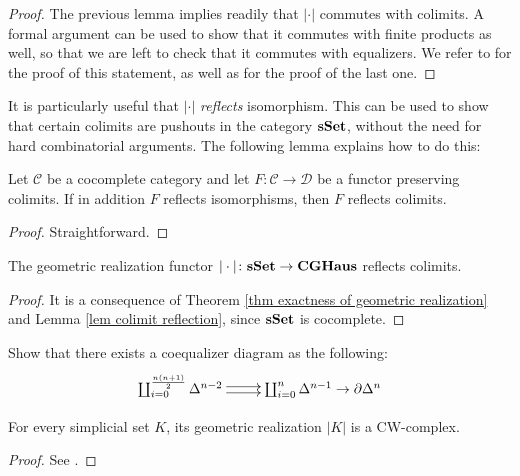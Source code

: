\begin{refsection}
\begin{proof}
The previous lemma implies readily that $| \cdot |$ commutes with colimits. A formal argument can be used to show that it commutes with finite products as well, so that we are left to check that it commutes with equalizers. We refer to \cite[Ch. III.3]{gz} for the proof of this statement, as well as for the proof of the last one.
\end{proof}

It is particularly useful that $| \cdot |$ \emph{reflects} isomorphism. This can be used to show that certain colimits are pushouts in the category $\mathbf{s\,\!\mathbf{Set}}$, without the need for hard combinatorial arguments. The following lemma explains how to do this:

\begin{lemma} \label{lem colimit reflection}
Let $\mathcal C$ be a cocomplete category and let $F \colon \mathcal C \to \mathcal D$ be a functor preserving colimits. If in addition $F$ reflects isomorphisms, then $F$ reflects colimits.
\end{lemma}

\begin{proof}
Straightforward.
\end{proof}

\begin{cor} \label{cor colimit in sset}
The geometric realization functor $| \cdot | \colon \mathbf{s\,\!\mathbf{Set}} \to \mathbf{CGHaus}$ reflects colimits.
\end{cor}

\begin{proof}
It is a consequence of Theorem \ref{thm exactness of geometric realization} and Lemma \ref{lem colimit reflection}, since $\mathbf{s\,\!\mathbf{Set}}$ is cocomplete.
\end{proof}

\begin{exercise}
Show that there exists a coequalizer diagram as the following:
\[
\xymatrix{
\coprod_{i = 0}^{\frac{n(n+1)}{2}} \Delta^{n-2} \ar@<.5ex>[r] \ar@<-.5ex>[r] & \coprod_{i = 0}^{n} \Delta^{n-1} \to \partial \Delta^n
}
\]
\end{exercise}

\begin{cor}
For every simplicial set $K$, its geometric realization $|K|$ is a CW-complex.
\end{cor}

\begin{proof}
See \cite[proposition I.2.3]{goerss-jardine-simplicial-homotopy-theory}.
\end{proof}


\end{refsection}
